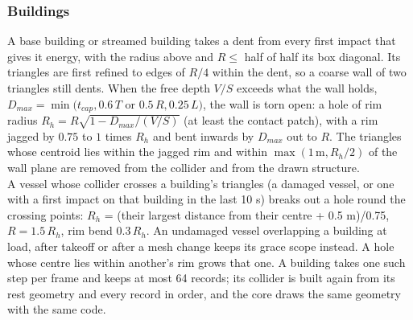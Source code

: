 \documentclass[Orbiter Technical Reference.tex]{subfiles}
\begin{document}
\subsubsection{Buildings}
A base building or streamed building takes a dent from every first impact that gives it energy, with the radius above and $R \le$ half of half its box diagonal. Its triangles are first refined to edges of $R/4$ within the dent, so a coarse wall of two triangles still dents. When the free depth $V/S$ exceeds what the wall holds, $D_{max} = \min(t_{cap}, 0.6\,T$ or $0.5\,R, 0.25\,L)$, the wall is torn open: a hole of rim radius $R_{h} = R\sqrt{1 - D_{max}/(V/S)}$ (at least the contact patch), with a rim jagged by $0.75$ to $1$ times $R_h$ and bent inwards by $D_{max}$ out to $R$. The triangles whose centroid lies within the jagged rim and within $\max(1\,\mathrm{m}, R_h/2)$ of the wall plane are removed from the collider and from the drawn structure.\\
A vessel whose collider crosses a building's triangles (a damaged vessel, or one with a first impact on that building in the last 10 s) breaks out a hole round the crossing points: $R_h$ = (their largest distance from their centre + 0.5 m)/0.75, $R = 1.5\,R_h$, rim bend $0.3\,R_h$. An undamaged vessel overlapping a building at load, after takeoff or after a mesh change keeps its grace scope instead. A hole whose centre lies within another's rim grows that one. A building takes one such step per frame and keeps at most 64 records; its collider is built again from its rest geometry and every record in order, and the core draws the same geometry with the same code.
\end{document}
